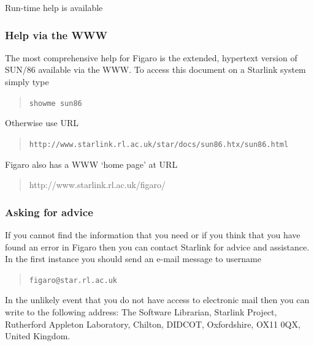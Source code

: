    Run-time help is available


\subsubsection{\label{gethelpfigwww}Help via the WWW}

   The most comprehensive help for Figaro is the extended, hypertext
   version of SUN/86 available via the WWW.  To access this document
   on a Starlink system simply type

  \begin{quote}
   {\tt showme sun86}
  \end{quote}

   Otherwise use URL

  \begin{quote}
   {\tt http://www.starlink.rl.ac.uk/star/docs/sun86.htx/sun86.html}
  \end{quote}

   Figaro also has a WWW `home page' at URL

  \begin{quote}
   {http://www.starlink.rl.ac.uk/figaro/}
  \end{quote}


\subsubsection{\label{gethelpsupport}Asking for advice}

   If you cannot find the information that you need or if you think
   that you have found an error in Figaro then you can contact Starlink
   for advice and assistance.  In the first instance you should send an
   e-mail message to username

  \begin{quote}
   {\tt figaro@star.rl.ac.uk}
  \end{quote}

   In the unlikely event that you do not have access to electronic mail
   then you can write to the following address: The Software Librarian,
   Starlink Project, Rutherford Appleton Laboratory, Chilton, DIDCOT,
   Oxfordshire, OX11 0QX, United Kingdom.

